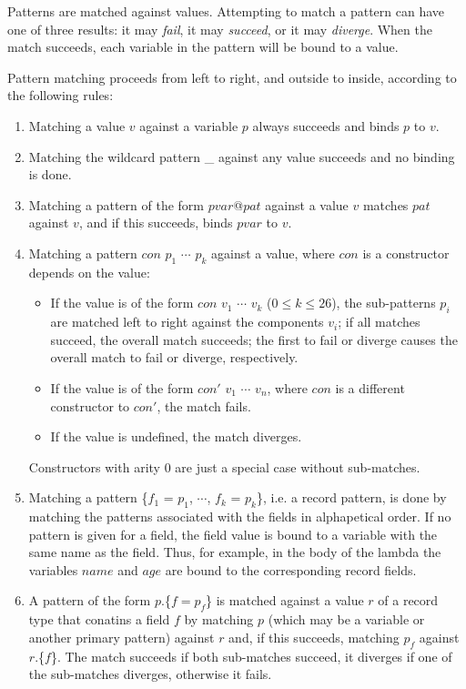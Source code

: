 Patterns are matched against values. Attempting to match a pattern can have one of three results: it may \emph{fail}, it may \emph{succeed}, or it may \emph{diverge}.
When the match succeeds, each variable in the pattern will be bound to a value.

Pattern matching proceeds from left to right, and outside to inside, according to the following rules:

\begin{enumerate}
\item Matching a value $v$ against a variable $p$ always succeeds and binds $p$ to $v$.
\item Matching the wildcard pattern \_ against any value succeeds and no binding is done.
\item Matching a pattern of the form $pvar$@$pat$ against a value $v$ matches $pat$ against $v$, and if this succeeds, binds $pvar$ to $v$.
\item Matching a pattern $con$ $p_1$ $\cdots$ $p_k$ against a value, where $con$ is a constructor depends on the value:
\begin{itemize}
\item If the value is of the form $con$ $v_1$ $\cdots$ $v_k$ ($0\le k\le 26$), the sub-patterns $p_i$ are matched left to right against the components $v_i$; if all matches succeed, the overall match succeeds; the first to fail or diverge causes the overall match to fail or diverge, respectively.
\item If the value is of the form $con'$ $v_1$ $\cdots$ $v_n$, where $con$ is a different constructor to $con'$, the match fails.
\item If the value is undefined, the match diverges.
\end{itemize}
Constructors with arity 0 are just a special case without sub-matches.
\item Matching a pattern \{$f_1$ = $p_1$, $\cdots$, $f_k$ = $p_k$\}, i.e. a record pattern, is done by matching the patterns associated with the fields in alphapetical order. If no pattern is given for a field, the field value is bound to a variable with the same name as the field. Thus, for example, in the body of the lambda  the variables $name$ and $age$ are bound to the corresponding record fields.
\item A pattern of the form $p$.\{$f=p_f$\} is matched against a value $r$ of a record type that conatins a field $f$ by matching $p$ (which may be a variable or another primary pattern) against $r$ and, if this succeeds, matching $p_f$ against $r$.\{$f$\}. The match succeeds if both sub-matches succeed, it diverges if one of the sub-matches diverges, otherwise it fails.


\end{enumerate}
